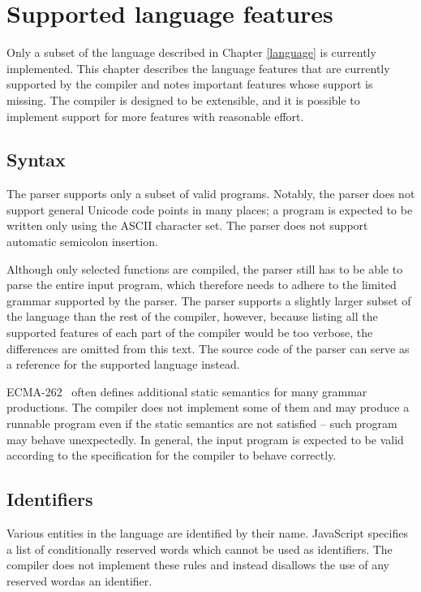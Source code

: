 \chapter{Supported language features}\label{chap:supported_lang}

Only a subset of the language described in Chapter \ref{language} is currently implemented. This chapter describes the language features that are currently supported by the compiler and notes important features whose support is missing. The compiler is designed to be extensible, and it is possible to implement support for more features with reasonable effort.


\section{Syntax}

The parser supports only a subset of valid programs. Notably, the parser does not support general Unicode code points in many places; a program is expected to be written only using the ASCII character set. The parser does not support automatic semicolon insertion.

Although only selected functions are compiled, the parser still has to be able to parse the entire input program, which therefore needs to adhere to the limited grammar supported by the parser. The parser supports a slightly larger subset of the language than the rest of the compiler, however, because listing all the supported features of each part of the compiler would be too verbose, the differences are omitted from this text. The source code of the parser can serve as a reference for the supported language instead.

ECMA-262~\cite{ecma262} often defines additional static semantics for many grammar productions. The compiler does not implement some of them and may produce a runnable program even if the static semantics are not satisfied -- such program may behave unexpectedly. In general, the input program is expected to be valid according to the specification for the compiler to behave correctly.


\section{Identifiers}

Various entities in the language are identified by their name. JavaScript specifies a list of conditionally reserved words which cannot be used as identifiers. The compiler does not implement these rules and instead disallows the use of any reserved word\footnotemark[1] as an identifier.

